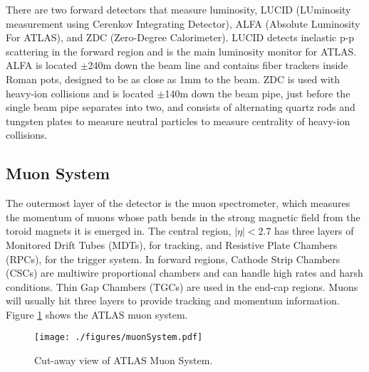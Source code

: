There are two forward detectors that measure luminosity, LUCID (LUminosity measurement using Cerenkov Integrating Detector), ALFA (Absolute Luminosity For ATLAS), and ZDC (Zero-Degree Calorimeter).  LUCID detects inelastic p-p scattering in the forward region and is the main luminosity monitor for ATLAS.  ALFA is located $\pm$240m down the beam line and contains fiber trackers inside Roman pots, designed to be as close as 1mm to the beam.  ZDC is used with heavy-ion collisions and is located $\pm$140m down the beam pipe, just before the single beam pipe separates into two, and consists of alternating quartz rods and tungsten plates to measure neutral particles to measure centrality of heavy-ion collisions.\\







\subsection{Muon System}

The outermost layer of the detector is the muon spectrometer, which measures the momentum of muons whose path bends in the strong magnetic field from the toroid magnets it is emerged in.  The central region, $|\eta|<2.7$ has three layers of Monitored Drift Tubes (MDTs), for tracking, and Resistive Plate Chambers (RPCs), for the trigger system.  In forward regions, Cathode Strip Chambers (CSCs) are multiwire proportional chambers and can handle high rates and harsh conditions.  Thin Gap Chambers (TGCs) are used in the end-cap regions.  Muons will usually hit three layers to provide tracking and momentum information.  Figure \ref{fig:muonCutAway} shows the ATLAS muon system.  \\

\begin{figure}[h!]
  \centering
	\texttt{[image: ./figures/muonSystem.pdf]}
\caption{\label{fig:muonCutAway}{ Cut-away view of ATLAS Muon System\cite{DetectorPaper:2008}. }} %
\end{figure}

